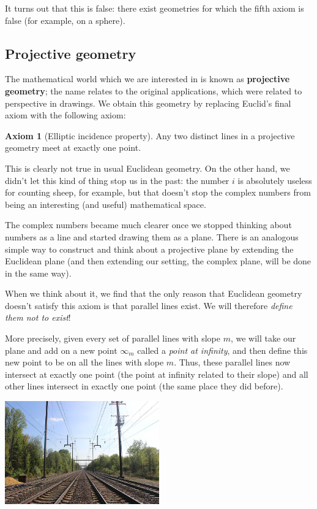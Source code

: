 \documentclass[a4paper,leqno,10pt]{article}
\theoremstyle{exercise}
\theoremstyle{plain}
\theoremstyle{definition}
\newtheorem*{axiom}{Axiom}
\theoremstyle{remark}
\newcommand{\df}{\textbf}
\begin{document}
It turns out that this is false: there exist geometries for which the fifth axiom is false (for example, on a sphere).

\subsection{Projective geometry}
The mathematical world which we are interested in is known as \df{projective geometry}; the name relates to the original
applications, which were related to perspective in drawings. We obtain this geometry by replacing Euclid's final axiom with the following axiom:
\begin{axiom}[Elliptic incidence property]
  Any two distinct lines in a projective geometry meet at exactly one point.
\end{axiom}
This is clearly not true in usual Euclidean geometry. On the other hand, we didn't let this kind of thing stop us in the
past: the number $ i $ is absolutely useless for counting sheep, for example, but that doesn't stop the complex numbers from
being an interesting (and useful) mathematical space.

The complex numbers became much clearer once we stopped thinking about numbers as a line and started drawing them as a plane. There
is an analogous simple way to construct and think about a projective plane by extending the Euclidean plane (and then extending our
setting, the complex plane, will be done in the same way).

When we think about it, we find that the only reason that Euclidean geometry doesn't satisfy this axiom is that parallel lines exist.
We will therefore \emph{define them not to exist}!

More precisely, given every set of parallel lines with slope $ m $, we will take our plane and add on a new point $ \infty_m $ called
a \emph{point at infinity}, and then define this new point to be on all the lines with slope $ m $. Thus, these parallel lines now
intersect at exactly one point (the point at infinity related to their slope) and all other lines intersect in exactly one point (the
same place they did before).

\begin{center}
  \includegraphics[width=0.5\textwidth]{vanishingpoint}
\end{center}
\end{document}
